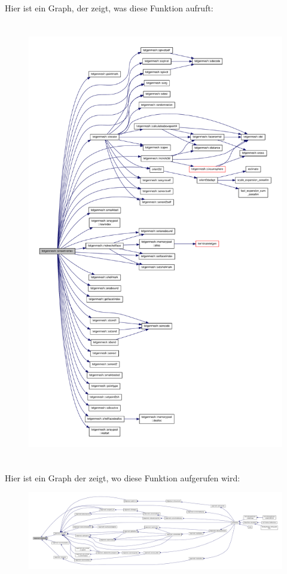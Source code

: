Hier ist ein Graph, der zeigt, was diese Funktion aufruft\-:
\nopagebreak
\begin{figure}[H]
\begin{center}
\leavevmode
\includegraphics[height=550pt]{classtetgenmesh_ad48cec74c7fbcf66ebd312661da5d0bc_cgraph}
\end{center}
\end{figure}




Hier ist ein Graph der zeigt, wo diese Funktion aufgerufen wird\-:
\nopagebreak
\begin{figure}[H]
\begin{center}
\leavevmode
\includegraphics[width=350pt]{classtetgenmesh_ad48cec74c7fbcf66ebd312661da5d0bc_icgraph}
\end{center}
\end{figure}


